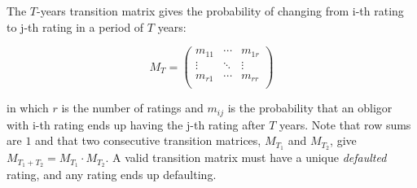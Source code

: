 \documentclass[11pt,fleqn]{book} %
\begin{document}
\begin{definition}
	\label{def:tm}
	The $T$-years transition matrix gives the probability of changing 
	from i-th rating to j-th rating in a period of $T$ years:
	{\small
	\begin{displaymath}
		M_T = \left(
		\begin{array}{ccc}
			m_{11} & \cdots & m_{1r} \\
			\vdots & \ddots & \vdots \\
			m_{r1} & \cdots & m_{rr} \\
		\end{array}
		\right)
	\end{displaymath}\par}
	in which $r$ is the number of ratings and $m_{ij}$ is the probability that 
	an obligor with i-th rating ends up having the j-th rating after $T$ years.
	Note that row sums are $1$ and that two consecutive transition matrices, 
	$M_{T_1}$ and $M_{T_2}$, give $M_{T_1+T_2} = M_{T_1} \cdot M_{T_2}$.
	A valid transition matrix must have a unique \emph{defaulted} rating, and 
	any rating ends up defaulting.
\end{definition}
\end{document}
